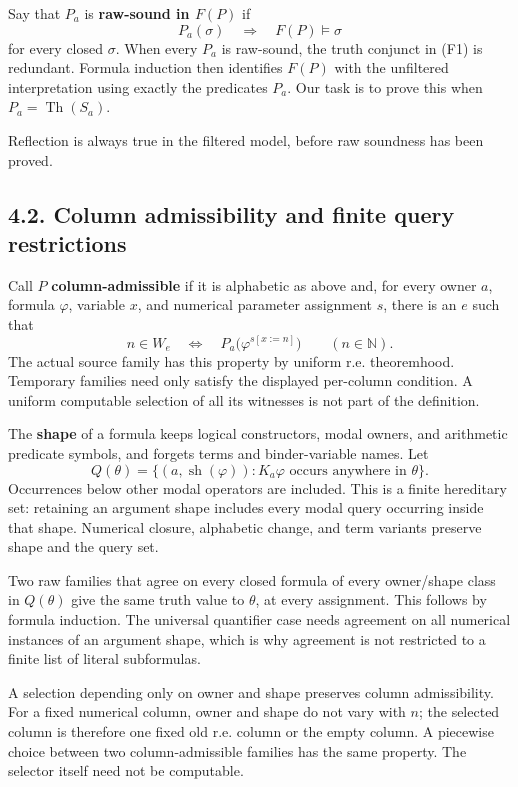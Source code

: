 \documentclass[
  11pt,
  letterpaper,
]{article}
\begin{document}
Say that \(P_a\) is \textbf{raw-sound in \(F(P)\)} if \[
P_a(\sigma)\quad\Longrightarrow\quad F(P)\models\sigma
\] for every closed \(\sigma\). When every \(P_a\) is raw-sound, the
truth conjunct in (F1) is redundant. Formula induction then identifies
\(F(P)\) with the unfiltered interpretation using exactly the predicates
\(P_a\). Our task is to prove this when \(P_a=\operatorname{Th}(S_a)\).

Reflection is always true in the filtered model, before raw soundness
has been proved.

\subsection{4.2. Column admissibility and finite query
restrictions}\label{column-admissibility-and-finite-query-restrictions}

Call \(P\) \textbf{column-admissible} if it is alphabetic as above and,
for every owner \(a\), formula \(\varphi\), variable \(x\), and
numerical parameter assignment \(s\), there is an \(e\) such that \[
n\in W_e
\quad\Longleftrightarrow\quad
P_a\bigl(\varphi^{s[x:=n]}\bigr)
\qquad(n\in\mathbb N).
\tag{F2}
\] The actual source family has this property by uniform r.e.
theoremhood. Temporary families need only satisfy the displayed
per-column condition. A uniform computable selection of all its
witnesses is not part of the definition.

The \textbf{shape} of a formula keeps logical constructors, modal
owners, and arithmetic predicate symbols, and forgets terms and
binder-variable names. Let \[
Q(\theta)=
\{(a,\operatorname{sh}(\varphi)):
       K_a\varphi\text{ occurs anywhere in }\theta\}.
\tag{F3}
\] Occurrences below other modal operators are included. This is a
finite hereditary set: retaining an argument shape includes every modal
query occurring inside that shape. Numerical closure, alphabetic change,
and term variants preserve shape and the query set.

Two raw families that agree on every closed formula of every owner/shape
class in \(Q(\theta)\) give the same truth value to \(\theta\), at every
assignment. This follows by formula induction. The universal quantifier
case needs agreement on all numerical instances of an argument shape,
which is why agreement is not restricted to a finite list of literal
subformulas.

A selection depending only on owner and shape preserves column
admissibility. For a fixed numerical column, owner and shape do not vary
with \(n\); the selected column is therefore one fixed old r.e. column
or the empty column. A piecewise choice between two column-admissible
families has the same property. The selector itself need not be
computable.
\end{document}
